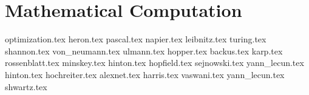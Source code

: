 \part{Mathematical Computation}
{optimization.tex}
{heron.tex}
{pascal.tex}
{napier.tex}
{leibnitz.tex}
{turing.tex}
{shannon.tex}
{von_neumann.tex}
{ulmann.tex}
{hopper.tex}
{backus.tex}
{karp.tex}
{rossenblatt.tex}
{minskey.tex}
{hinton.tex}
{hopfield.tex}
{sejnowski.tex}
{yann_lecun.tex}
{hinton.tex}
{hochreiter.tex}
{alexnet.tex}
{harris.tex}
{vaswani.tex}
{yann_lecun.tex}
{shwartz.tex}